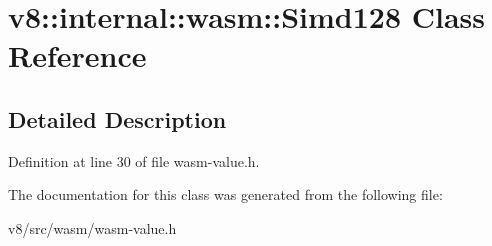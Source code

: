 \hypertarget{classv8_1_1internal_1_1wasm_1_1Simd128}{}\section{v8\+:\+:internal\+:\+:wasm\+:\+:Simd128 Class Reference}
\label{classv8_1_1internal_1_1wasm_1_1Simd128}


\subsection{Detailed Description}


Definition at line 30 of file wasm-\/value.\+h.



The documentation for this class was generated from the following file\+:\begin{DoxyCompactItemize}
\item 
v8/src/wasm/wasm-\/value.\+h\end{DoxyCompactItemize}
